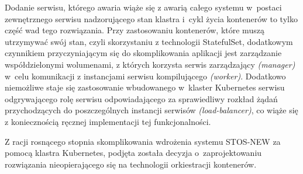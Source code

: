 Dodanie serwisu, którego awaria wiąże się z awarią całego systemu w~postaci zewnętrznego serwisu nadzorującego stan klastra i~cykl życia kontenerów to tylko część wad tego rozwiązania. Przy zastosowaniu kontenerów, które muszą utrzymywać swój stan, czyli skorzystaniu z technologii StatefulSet, dodatkowym czynnikiem przyczyniającym się do skomplikowania aplikacji jest zarządzanie współdzielonymi wolumenami, z których korzysta serwis zarządzający \textit{(manager)} w~celu komunikacji z instancjami serwisu kompilującego \textit{(worker)}. Dodatkowo niemożliwe staje się zastosowanie wbudowanego w~klaster Kubernetes serwisu odgrywającego rolę serwisu odpowiadającego za sprawiedliwy rozkład żądań przychodzących do poszczególnych instancji serwisów \textit{(load-balancer)}, co wiąże się z koniecznością ręcznej implementacji tej funkcjonalności.

Z racji rosnącego stopnia skomplikowania wdrożenia systemu STOS-NEW za pomocą klastra Kubernetes, podjęta została decyzja o~zaprojektowaniu rozwiązania nieopierającego się na technologii orkiestracji kontenerów.
